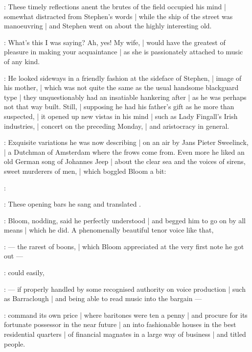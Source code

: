 :
These timely reflections anent the brutes of the field occupied his mind |
somewhat distracted from Stephen's words |
while the ship of the street was manoeuvring |
and Stephen went on about the highly interesting old.

\Bloom:
What's this I was saying?
Ah, yes!
My wife, |
would have the greatest of pleasure in making your acquaintance |
as she is passionately attached to music of any kind.

:
He looked sideways in a friendly fashion at the sideface of Stephen, |
image of his mother, |
which was not quite the same as the usual handsome blackguard type |
they unquestionably had an insatiable hankering after |
as he was perhaps not that way built.
Still, |
supposing he had his father's gift as he more than suspected, |
it opened up new vistas in his mind |
such as Lady Fingall's Irish industries, |
concert on the preceding Monday, |
and aristocracy in general.

:
Exquisite variations he was now describing |
on an air  by Jans Pieter Sweelinck, |
a Dutchman of Amsterdam where the frows come from.
Even more he liked an old German song of Johannes Jeep |
about the clear sea and the voices of sirens, sweet murderers of men, |
which boggled Bloom a bit:

\Stephen:
\begin{verse}
\end{verse}

:
These opening bars he sang and translated .

:
Bloom, nodding, said he perfectly understood |
and begged him to go on by all means |
which he did.
A phenomenally beautiful tenor voice like that,

:
    --- the rarest of boons, |
        which Bloom appreciated at the very first note he got out  ---

:
could easily,

:
    --- if properly handled by some recognised authority on voice production |
        such as Barraclough |
        and being able to read music into the bargain ---

:
command its own price |
where baritones were ten a penny |
and procure for its fortunate possessor in the near future |
an  into fashionable houses in the best residential quarters |
of financial magnates in a large way of business |
and titled people.

